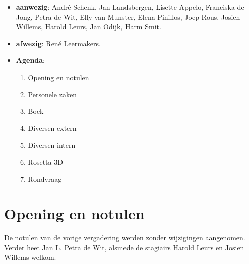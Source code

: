 
   \RosDate{\today}
   \RosSupersedes{-}
   \MakeRosTitle
{}
\begin{itemize}
  \item {\bf aanwezig}: Andr\'{e} Schenk, Jan Landsbergen, Lisette Appelo,
                     Franciska de Jong, Petra de Wit, Elly van Munster, 
                     Elena Pinillos, Joep Rous, Josien Willems, 
                     Harold Leurs, Jan Odijk, Harm Smit.
  \item {\bf afwezig}: Ren\'{e} Leermakers.
  \item {\bf Agenda}:
    \begin{enumerate}
       \item Opening en notulen
       \item Personele zaken
       \item Boek
       \item Diversen extern
       \item Diversen intern
       \item Rosetta 3D
       \item Rondvraag
    \end{enumerate}
\end{itemize}

\section {Opening en notulen}
De notulen van de vorige vergadering werden zonder wijzigingen aangenomen.
Verder heet Jan L. Petra de Wit, alsmede de stagiairs Harold Leurs en
         Josien Willems welkom.

